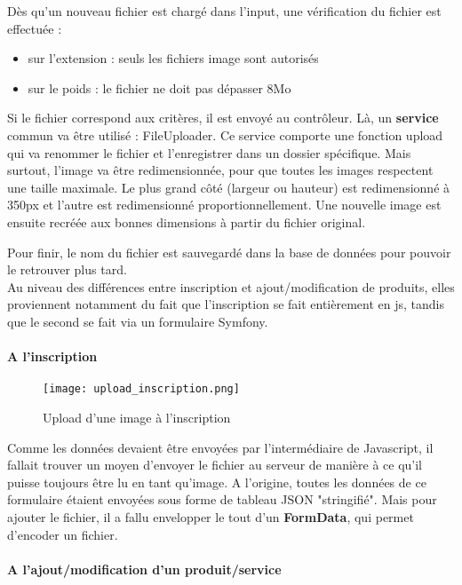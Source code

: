 Dès qu'un nouveau fichier est chargé dans l'input, une vérification du fichier est effectuée : 
\begin{itemize}
    \item sur l'extension : seuls les fichiers image sont autorisés 
    \item sur le poids : le fichier ne doit pas dépasser 8Mo\\
\end{itemize}

Si le fichier correspond aux critères, il est envoyé au contrôleur. Là, un \textbf{service} commun va être utilisé : FileUploader.
Ce service comporte une fonction upload qui va renommer le fichier et l'enregistrer dans un dossier spécifique. 
Mais surtout, l'image va être redimensionnée, pour que toutes les images respectent une taille maximale.
Le plus grand côté (largeur ou hauteur) est redimensionné à 350px et l'autre est redimensionné proportionnellement.
Une nouvelle image est ensuite recréée aux bonnes dimensions à partir du fichier original.

Pour finir, le nom du fichier est sauvegardé dans la base de données pour pouvoir le retrouver plus tard.\\

Au niveau des différences entre inscription et ajout/modification de produits, elles proviennent notamment du fait que l'inscription se fait entièrement en js, tandis que le second se fait via un formulaire Symfony.

\paragraph*{A l'inscription}

\begin{figure}[H]
    \texttt{[image: upload\_inscription.png]}
    \caption{Upload d'une image à l'inscription}
\end{figure}

Comme les données devaient être envoyées par l'intermédiaire de Javascript, il fallait trouver un moyen d'envoyer le fichier au serveur de manière à ce qu'il puisse toujours être lu en tant qu'image.
A l'origine, toutes les données de ce formulaire étaient envoyées sous forme de tableau JSON "stringifié". Mais pour ajouter le fichier, il a fallu envelopper le tout d'un \textbf{FormData}, qui permet d'encoder un fichier.

\paragraph*{A l'ajout/modification d'un produit/service}

